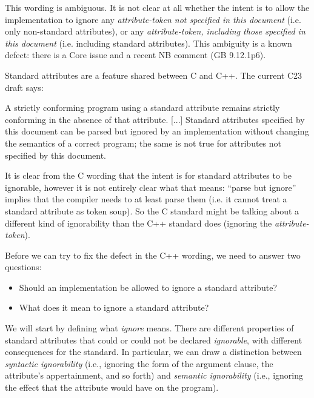 This wording is ambiguous. It is not clear at all whether the intent is to allow the implementation to ignore any  \emph{attribute-token not specified in this document} (i.e. only non-standard attributes), or any  \emph{attribute-token, including those specified in this document} (i.e. including standard attributes). This ambiguity is a known defect: there is a Core issue \cite{CWG2538} and a recent NB comment (GB 9.12.1p6).

Standard attributes are a feature shared between C and C++. The current C23 draft says:

\begin{adjustwidth}{0.5cm}{0.5cm}
A strictly conforming program using a standard attribute remains
strictly conforming in the absence of that attribute. [...] Standard attributes specified by this document can be parsed but ignored by an implementation without changing the semantics of a correct program; the same is not true for attributes not specified by this document.
\end{adjustwidth}

It is clear from the C wording that the intent is for standard attributes to be ignorable, however it is not entirely clear what that means: ``parse but ignore'' implies that the compiler needs to at least parse them (i.e. it cannot treat a standard attribute as token soup). So the C standard might be talking about a different kind of ignorability than the C++ standard does (ignoring the \emph{attribute-token}).

\pagebreak %

Before we can try to fix the defect in the C++ wording, we need to answer two questions:

\begin{itemize}
\item Should an implementation be allowed to ignore a standard attribute?
\item What does it mean to ignore a standard attribute?
\end{itemize}

We will start by defining what \emph{ignore} means. There are different properties of standard attributes that could or could not be declared \emph{ignorable}, with different consequences for the standard. In particular, we can draw a distinction between \emph{syntactic ignorability} (i.e., ignoring the form of the argument clause, the attribute's appertainment, and so forth) and \emph{semantic ignorability} (i.e., ignoring the effect that the attribute would have on the program).

